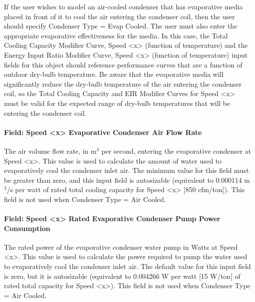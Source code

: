 If the user wishes to model an air-cooled condenser that has evaporative media placed in front of it to cool the air entering the condenser coil, then the user should specify Condenser Type = Evap Cooled. The user must also enter the appropriate evaporative effectiveness for the media. In this case, the Total Cooling Capacity Modifier Curve, Speed \textless{}x\textgreater{} (function of temperature) and the Energy Input Ratio Modifier Curve, Speed \textless{}x\textgreater{} (function of temperature) input fields for this object should reference performance curves that are a function of outdoor dry-bulb temperature. Be aware that the evaporative media will significantly reduce the dry-bulb temperature of the air entering the condenser coil, so the Total Cooling Capacity and EIR Modifier Curves for Speed \textless{}x\textgreater{} must be valid for the expected range of dry-bulb temperatures that will be entering the condenser coil.

\paragraph{Field: Speed \textless{}x\textgreater{} Evaporative Condenser Air Flow Rate}\label{field-speed-x-evaporative-condenser-air-flow-rate}

The air volume flow rate, in m\(^{3}\) per second, entering the evaporative condenser at Speed \textless{}x\textgreater{}. This value is used to calculate the amount of water used to evaporatively cool the condenser inlet air. The minimum value for this field must be greater than zero, and this input field is autosizable (equivalent to 0.000114 m\(^{3}\)/s per watt of rated total cooling capacity for Speed \textless{}x\textgreater{} {[}850 cfm/ton{]}). This field is not used when Condenser Type = Air Cooled.

\paragraph{Field: Speed \textless{}x\textgreater{} Rated Evaporative Condenser Pump Power Consumption}\label{field-speed-x-rated-evaporative-condenser-pump-power-consumption}

The rated power of the evaporative condenser water pump in Watts at Speed \textless{}x\textgreater{}. This value is used to calculate the power required to pump the water used to evaporatively cool the condenser inlet air. The default value for this input field is zero, but it is autosizable (equivalent to 0.004266 W per watt {[}15 W/ton{]} of rated total capacity for Speed \textless{}x\textgreater{}). This field is not used when Condenser Type = Air Cooled.

